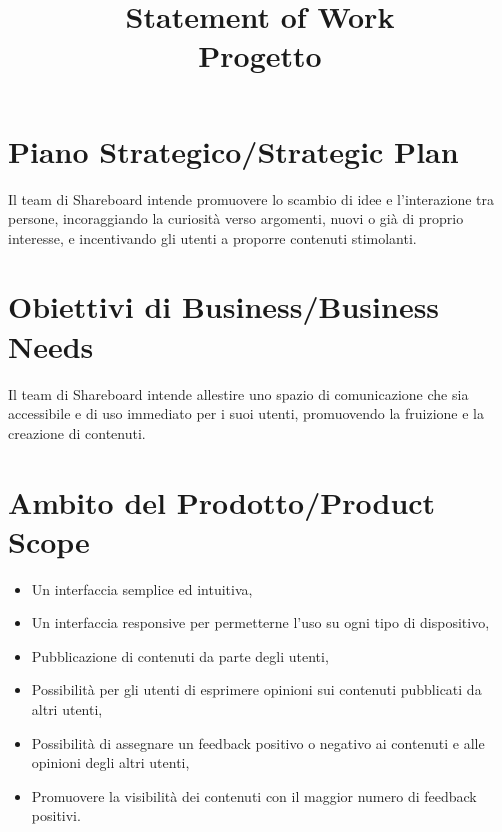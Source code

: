 \documentclass[12pt]{article}
\title{Statement of Work\\Progetto}
\author{\presentatoda}
\begin{document}
\maketitle

\begin{versionhistory}
\end{versionhistory}
\clearpage

\section{Piano Strategico/Strategic Plan}
  Il team di Shareboard intende promuovere lo scambio di idee e l’interazione tra persone, incoraggiando la curiosità verso argomenti, nuovi o già di proprio interesse, e incentivando gli utenti a proporre contenuti stimolanti.
  
  \section{Obiettivi di Business/Business Needs}
  Il team di Shareboard intende allestire uno spazio di comunicazione che sia accessibile e di uso immediato per i suoi utenti, promuovendo la fruizione e la creazione di contenuti.
  
  \section{Ambito del Prodotto/Product Scope}
  
  \begin{itemize}
  
  \item Un interfaccia semplice ed intuitiva,
  \item Un interfaccia responsive per permetterne l’uso su ogni tipo di dispositivo,
  \item Pubblicazione di contenuti da parte degli utenti,
  \item Possibilità per gli utenti di esprimere opinioni sui contenuti pubblicati da altri utenti,
  \item Possibilità di assegnare un feedback positivo o negativo ai contenuti e alle opinioni degli altri utenti,
  \item Promuovere la visibilità dei contenuti con il maggior numero di feedback positivi.
  
  \end{itemize}
  
\end{document}
